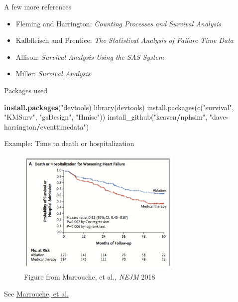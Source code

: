 \documentclass[ignorenonframetext,]{beamer}
\newenvironment{Shaded}{\begin{snugshade}}{\end{snugshade}}
\newcommand{\KeywordTok}[1]{\textcolor[rgb]{0.13,0.29,0.53}{\textbf{#1}}}
\newcommand{\NormalTok}[1]{#1}
\newcommand{\OperatorTok}[1]{\textcolor[rgb]{0.81,0.36,0.00}{\textbf{#1}}}
\newcommand{\StringTok}[1]{\textcolor[rgb]{0.31,0.60,0.02}{#1}}
\providecommand{\tightlist}{%
  \setlength{\itemsep}{0pt}\setlength{\parskip}{0pt}}
\begin{document}
\begin{frame}{%
\protect\hypertarget{a-few-more-references}{%
A few more references}}

\begin{itemize}
\tightlist
\item
  Fleming and Harrington: \emph{Counting Processes and Survival
  Analysis}
\item
  Kalbfleisch and Prentice: \emph{The Statistical Analysis of Failure
  Time Data}
\item
  Allison: \emph{Survival Analysis Using the SAS System}
\item
  Miller: \emph{Survival Analysis}
\end{itemize}

\end{frame}

\begin{frame}[fragile]{%
\protect\hypertarget{packages-used}{%
Packages used}}

\begin{Shaded}
\begin{Highlighting}[]
\KeywordTok{install.packages}\NormalTok{(}\StringTok{"devtools)}
\StringTok{library(devtools)}
\StringTok{install.packages(c("}\NormalTok{survival}\StringTok{", "}\NormalTok{KMSurv}\StringTok{",}
\StringTok{                   "}\NormalTok{gsDesign}\StringTok{", "}\NormalTok{Hmisc}\StringTok{"))}
\StringTok{install_github("}\NormalTok{keaven}\OperatorTok{/}\NormalTok{nphsim}\StringTok{", "}\NormalTok{dave}\OperatorTok{-}\NormalTok{harrington}\OperatorTok{/}\NormalTok{eventtimedata}\StringTok{")}
\end{Highlighting}
\end{Shaded}

\end{frame}

\begin{frame}{%
\protect\hypertarget{example-time-to-death-or-hospitalization}{%
Example: Time to death or hospitalization}}

\begin{figure}
\centering
\includegraphics[width=0.7\textwidth,height=\textheight]{../figures/atrial_fib_death_hosp.pdf}
\caption{Figure from Marrouche, et al., \emph{NEJM} 2018}
\end{figure}

See
\href{../../clinical_papers/catheter_ablation_atrial_fib.pdf}{Marrouche,
et al.}

\end{frame}
\end{document}
